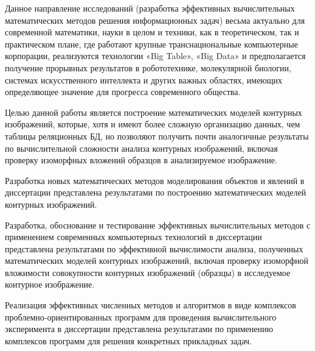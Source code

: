 Данное направление исследований (разработка эффективных вычислительных математических методов решения информационных задач) весьма актуально для современной математики, науки в целом и техники, как в теоретическом, так и  практическом плане, где работают крупные транснациональные компьютерные корпорации, реализуются технологии «Big Table»,  «Big Data» и предполагается получение прорывных результатов в робототехнике, молекулярной биологии, системах искусственного интеллекта и других важных областях, имеющих определяющее значение для прогресса современного общества.

Целью данной работы является построение математических моделей контурных изображений, которые, хотя и имеют более сложную организацию данных, чем  таблицы реляционных БД, но позволяют получить почти аналогичные результаты по вычислительной сложности  анализа контурных изображений, включая проверку изоморфных вложений образцов в анализируемое изображение.

Разработка новых математических методов моделирования объектов и явлений  в диссертации представлена результатами по построению математических моделей контурных изображений.

Разработка, обоснование и тестирование эффективных вычислительных методов с применением современных компьютерных технологий в диссертации представлена результатами по эффективной вычислимости анализа, полученных математических моделей контурных изображений, включая проверку изоморфной вложимости совокупности контурных изображений (образцы) в исследуемое контурное изображение.

Реализация эффективных численных методов и алгоритмов в виде комплексов проблемно-ориентированных программ для проведения вычислительного эксперимента в диссертации представлена результатами по применению комплексов программ для решения конкретных прикладных задач.

